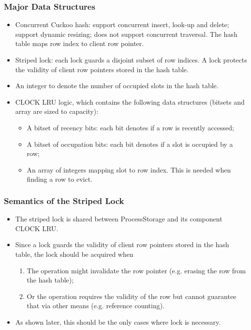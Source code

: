 \documentclass{beamer}
\begin{document}
\begin{frame}
\frametitle{Major Data Structures}
\begin{itemize}
\item Concurrent Cuckoo hash: support concurrent insert, look-up and delete; 
support dynamic resizing; does not support concurrent traversal. The hash table
maps row index to client row pointer.
\item Striped lock: each lock guards a disjoint subset of row indices. A lock 
protects the validity of client row pointers stored in the hash table.
\item An integer to denote the number of occupied slots in the hash table.
\item CLOCK LRU logic, which contains the following data structures (bitsets and
 array are sized to capacity):
\begin{itemize}
\item A bitset of recency bits: each bit denotes if a row is recently accessed;
\item A bitset of occupation bits: each bit denotes if a slot is occupied by a row;
\item An array of integers mapping slot to row index. This is needed when 
finding a row to evict. 
\end{itemize}
\end{itemize}
\end{frame}

\begin{frame}
\frametitle{Semantics of the Striped Lock}
\begin{itemize}
\item The striped lock is shared between ProcessStorage and its component CLOCK 
LRU.
\item Since a lock guards the validity of client row pointers stored in the hash
  table, the lock should be acquired when
\begin{enumerate}
\item The operation might invalidate the row pointer (e.g. erasing the row from 
  the hash table);
\item Or the operation requires the validity of the row but cannot guarantee that
via other means (e.g. reference counting).
\end{enumerate}
\item As shown later, this should be the only cases where lock is necessary.
\end{itemize}
\end{frame}
\end{document}
